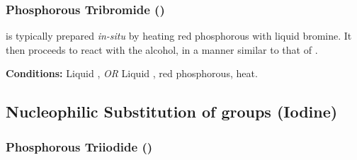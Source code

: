 
			\subsubsection{Phosphorous Tribromide ()}

				 is typically prepared \textit{in-situ} by heating red phosphorous with liquid bromine. It then proceeds to
				react with the alcohol, in a manner similar to that of .

				\vspace{1.5em}
				\vbox{\textbf{Conditions:}	\tabto{35mm}Liquid , \textit{OR}
											\tabto{35mm}Liquid , {\color{Red}red} phosphorous, heat.}





		\pagebreak
		\subsection{Nucleophilic Substitution of  groups (Iodine)}

			\subsubsection{Phosphorous Triiodide ()}

